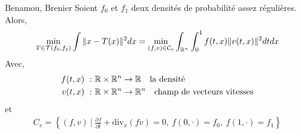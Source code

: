 \documentclass[a4paper,12pt]{article}
\begin{document}
\begin{theoreme}{Benamou, Brenier}
Soient $f_0$ et $f_1$ deux densités de probabilité assez régulières. Alors, 
\begin{align}
\min_{T\in\mathcal{T}(f_0,f_1)} \int\|x-T(x)\|^2dx =\min_{(f,v)\in\mathcal{C}_v}\int_{\mathbb{R}^n}\int_0^1 f(t,x)\|v(t,x)\|^2dtdx
\end{align}
Avec,
\begin{align*}
f(t,x)\ :&\ \mathbb{R}\times\mathbb{R}^n\rightarrow \mathbb{R} \quad \text{la densité}\\
v(t,x)\ :&\ \mathbb{R}\times\mathbb{R}^n\rightarrow \mathbb{R}^n \quad \text{champ de vecteurs vitesses}
\end{align*}
et 
\begin{align}
C_v=\left\{(f,v)\ |\ \frac{\partial f}{\partial t} + \text{div}_x (fv) =0,\ f(0,\cdot) = f_0,\ f(1,\cdot)=f_1 \right\}
\label{eq:contraintes}
\end{align}
\end{theoreme}
\end{document}
